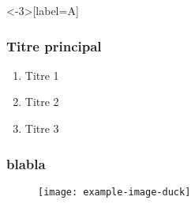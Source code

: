 \documentclass{beamer}
\begin{document}
\begin{frame}<-3>[label=A]
    \frametitle{Titre principal}
    \pause
    \begin{enumerate}[<+-|alert@+>]
        \item Titre 1
        \item Titre 2
            \item Titre 3
    \end{enumerate}
\end{frame}

\begin{frame}[label=B]
    \frametitle{blabla}
    \begin{figure}
        \texttt{[image: example-image-duck]}
    \end{figure}
\end{frame}

\end{document}
